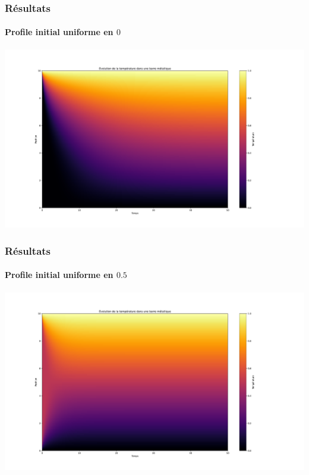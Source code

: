 \documentclass{beamer}
\begin{document}
    \begin{frame}
    \frametitle{Résultats}
    \framesubtitle{Profile initial uniforme en $0$}

    \begin{center}
    \includegraphics[width=1.2\linewidth]{figs/Figure_1.pdf}
    \end{center}


    \end{frame}


    \begin{frame}
    \frametitle{Résultats}
    \framesubtitle{Profile initial uniforme en $0.5$}

    \begin{center}
    \includegraphics[width=1.2\linewidth]{figs/Figure_2.pdf}
    \end{center}


    \end{frame}
\end{document}
